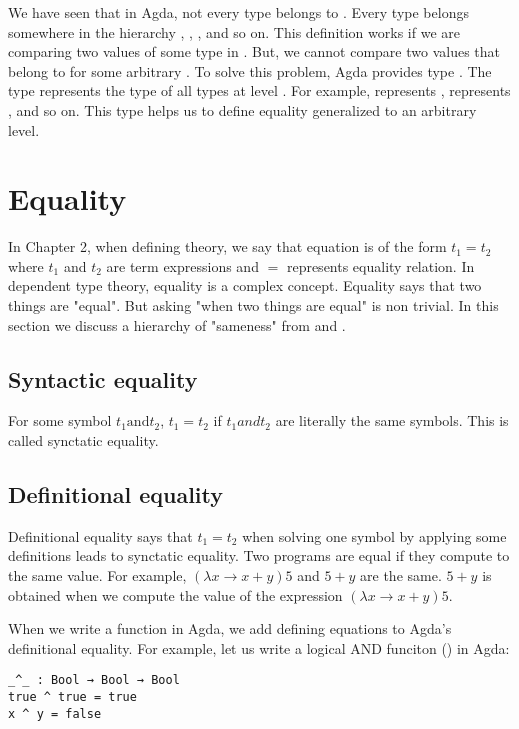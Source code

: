 We have seen that in Agda, not every type belongs to . Every
type belongs somewhere in the hierarchy , ,
, and so on. This definition works if we are comparing two values
of some type in . But, we cannot compare two values that belong to
 for some arbitrary . To solve this problem, Agda
provides type . The type  represents the type of all
types at level . For example,  represents ,
 represents , and so on. This type helps us to define
equality generalized to an arbitrary level.

\section{Equality}
\label{equality}
In Chapter 2, when defining theory, we say that equation is of the form $t_1 =
t_2$ where $t_1$ and $t_2$ are term expressions and $=$ represents equality
relation. In dependent type theory, equality is a complex concept. Equality says
that two things are "equal". But asking "when two things are equal" is non
trivial. In this section we discuss a hierarchy of "sameness" from
\cite{bocquet2020coherence} and \cite{eremondi2022propositional}.

\subsection{Syntactic equality}
For some symbol $t_1 \text{and} t_2$, $t_1 = t_2$ if $t_1 and t_2$ are literally
the same symbols. This is called synctatic equality.

\subsection{Definitional equality}
Definitional equality says that $t_1 = t_2$ when solving one symbol by applying
some definitions leads to synctatic equality. Two programs are equal if they
compute to the same value. For example, $(\lambda x \rightarrow x + y) 5$ and $5
+ y$ are the same. $5 + y$ is obtained when we compute the value of the
expression $ (\lambda x \rightarrow x + y) 5$.

When we write a function in Agda, we add defining equations to Agda's
definitional equality. For example, let us write a logical AND funciton
(\inline{_^_}) in Agda:

\begin{verbatim}
_^_ : Bool → Bool → Bool
true ^ true = true
x ^ y = false
\end{verbatim}

